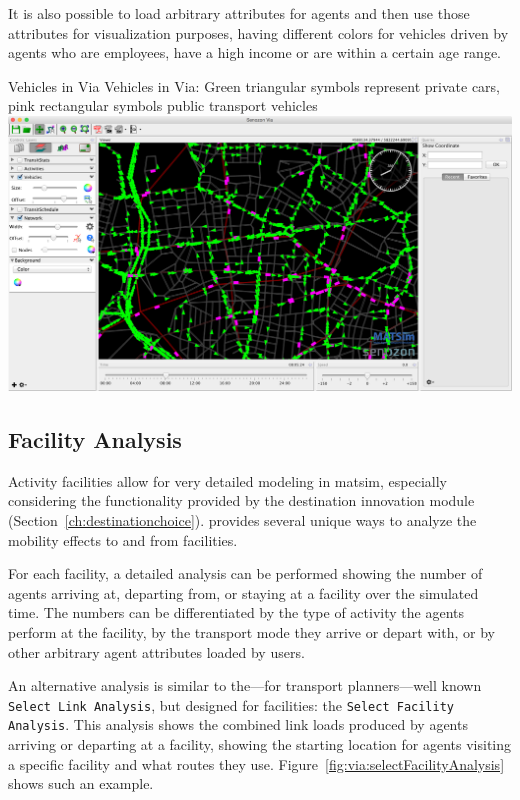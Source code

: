 It is also possible to load arbitrary attributes for agents and then use those attributes
for visualization purposes, \eg having different colors for vehicles
driven by agents who are employees, have a high income or are within a certain
age range.

\createfigure%
{Vehicles in Via}%
{Vehicles in Via: Green triangular symbols represent private cars, pink rectangular symbols public transport vehicles}%
{\label{fig:via:vehicles}}%
{\includegraphics[width=1.\textwidth,angle=0]{./extending/figures/via/vehicles}}%
{}

\subsection{Facility Analysis}
Activity facilities allow for very detailed modeling in \gls{matsim}, especially
considering the functionality provided by the destination innovation \gls{module}
(Section~\ref{ch:destinationchoice}). \Via{} provides several unique ways to
analyze the mobility effects to and from facilities.

For each facility, a detailed analysis can be performed showing the number of
agents arriving at, departing from, or staying at a \gls{facility} over the simulated
time. The numbers can be differentiated by the type of \gls{activity} the agents
perform at the facility, by the transport mode they arrive or depart with, or by
other arbitrary agent attributes loaded by users.

An alternative analysis is similar to the---for transport planners---well known
\lstinline|Select Link Analysis|, but designed for facilities: the \lstinline|Select Facility Analysis|. This
analysis shows the combined link loads produced by agents arriving or departing
at a facility, showing the starting location for agents visiting a specific \gls{facility} and
what routes they use. Figure~\ref{fig:via:selectFacilityAnalysis} shows
such an example.

